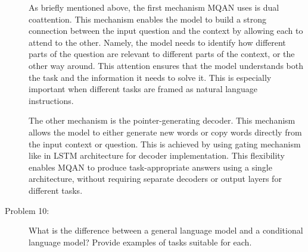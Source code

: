 \documentclass[10pt]{article}
\begin{document}
\begin{description}
As briefly mentioned above, the first mechanism MQAN uses is dual coattention.
This mechanism enables the model to build a strong connection between the input question and the context by allowing each to attend to the other. 
Namely, the model needs to identify how different parts of the question are relevant to different parts of the context, or the other way around.
This attention ensures that the model understands both the task and the information it needs to solve it. 
This is especially important when different tasks are framed as natural language instructions.

The other mechanism is the pointer-generating decoder.
This mechanism allows the model to either generate new words or copy words directly from the input context or question.
This is achieved by using gating mechanism like in LSTM architecture for decoder implementation.
This flexibility enables MQAN to produce task-appropriate answers using a single architecture, without requiring separate decoders or output layers for different tasks.

\pagebreak

\item[Problem 10:] What is the difference between a general language model and a conditional language model? Provide examples of tasks suitable for each.

\end{description}
\end{document}
